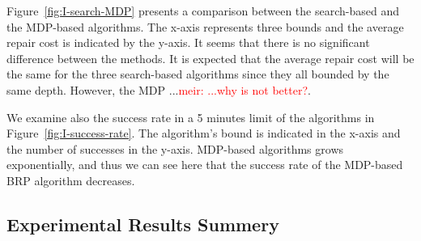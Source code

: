 \documentclass[review]{elsarticle}
\newcommand\meir[1]{\textcolor{red}{meir: #1}}
\begin{document}
Figure~\ref{fig:I-search-MDP} presents a comparison between the search-based and the MDP-based algorithms. The x-axis represents three bounds and the average repair cost is indicated by the y-axis.
It seems that there is no significant difference between the methods. It is expected that the average repair cost will be the same for the three search-based algorithms since they all bounded by the same depth. However, the MDP ...\meir{...why is not better?}. 

We examine also the success rate in a 5 minutes limit of the algorithms in Figure~\ref{fig:I-success-rate}. The algorithm's bound is indicated in the x-axis and the number of successes in the y-axis. MDP-based algorithms grows exponentially, and thus we can see here that the success rate of the MDP-based BRP algorithm decreases.  


\subsection{Experimental Results Summery}
\end{document}
